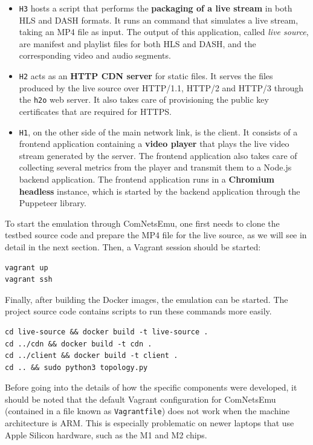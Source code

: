 \begin{itemize}
    \item \texttt{H3} hosts a script that performs the \textbf{packaging of a live stream} in both HLS and DASH formats. It runs an \ffmpeg{} command that simulates a live stream, taking an MP4 file as input. The output of this application, called \textit{live source}, are manifest and playlist files for both HLS and DASH, and the corresponding video and audio segments.
    \item \texttt{H2} acts as an \textbf{HTTP CDN server} for static files. It serves the files produced by the live source over HTTP/1.1, HTTP/2 and HTTP/3 through the \texttt{h2o} web server. It also takes care of provisioning the public key certificates that are required for HTTPS.
    \item \texttt{H1}, on the other side of the main network link, is the client. It consists of a frontend application containing a \textbf{video player} that plays the live video stream generated by the server. The frontend application also takes care of collecting several metrics from the player and transmit them to a Node.js backend application. The frontend application runs in a \textbf{Chromium headless} instance, which is started by the backend application through the Puppeteer library.
\end{itemize}


To start the emulation through ComNetsEmu, one first needs to clone the testbed source code and prepare the MP4 file for the live source, as we will see in detail in the next section. Then, a Vagrant session should be started:

\begin{verbatim}
vagrant up
vagrant ssh
\end{verbatim}

Finally, after building the Docker images, the emulation can be started. The project source code contains scripts to run these commands more easily.

\begin{verbatim}
cd live-source && docker build -t live-source .
cd ../cdn && docker build -t cdn .
cd ../client && docker build -t client .
cd .. && sudo python3 topology.py
\end{verbatim}

Before going into the details of how the specific components were developed, it should be noted that the default Vagrant configuration for ComNetsEmu (contained in a file known as \texttt{Vagrantfile}) does not work when the machine architecture is ARM. This is especially problematic on newer laptops that use Apple Silicon hardware, such as the M1 and M2 chips.


